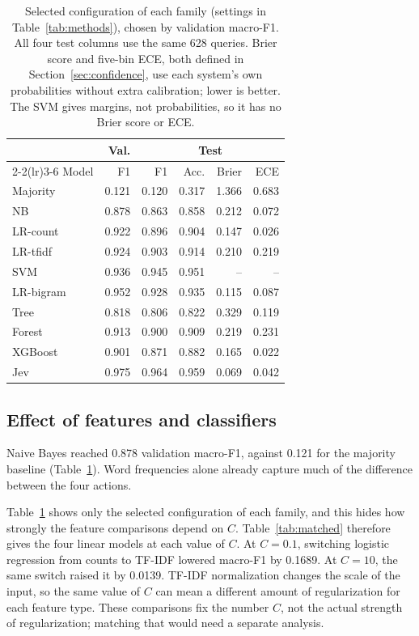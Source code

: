 \documentclass[conference]{IEEEtran}
\begin{document}
\begin{table}[tbp]
\centering\caption{Selected configuration of each family (settings in Table~\ref{tab:methods}), chosen by validation macro-F1. All four test columns use the same 628 queries. Brier score and five-bin ECE, both defined in Section~\ref{sec:confidence}, use each system's own probabilities without extra calibration; lower is better. The SVM gives margins, not probabilities, so it has no Brier score or ECE.}\label{tab:results}
\setlength{\tabcolsep}{4pt}
\begin{tabular}{lrrrrr}\toprule
&Val.&\multicolumn{4}{c}{Test}\\ \cmidrule(lr){2-2}\cmidrule(lr){3-6}
Model & F1 & F1 & Acc. & Brier & ECE\\ \midrule
Majority & 0.121 & 0.120 & 0.317 & 1.366 & 0.683\\
NB & 0.878 & 0.863 & 0.858 & 0.212 & 0.072\\
LR-count & 0.922 & 0.896 & 0.904 & 0.147 & 0.026\\
LR-tfidf & 0.924 & 0.903 & 0.914 & 0.210 & 0.219\\
SVM & 0.936 & 0.945 & 0.951 & -- & --\\
LR-bigram & 0.952 & 0.928 & 0.935 & 0.115 & 0.087\\
Tree & 0.818 & 0.806 & 0.822 & 0.329 & 0.119\\
Forest & 0.913 & 0.900 & 0.909 & 0.219 & 0.231\\
XGBoost & 0.901 & 0.871 & 0.882 & 0.165 & 0.022\\
Jev & 0.975 & 0.964 & 0.959 & 0.069 & 0.042\\ \bottomrule
\end{tabular}
\end{table}

\subsection{Effect of features and classifiers}
Naive Bayes reached 0.878 validation macro-F1, against 0.121 for the majority baseline (Table~\ref{tab:results}). Word frequencies alone already capture much of the difference between the four actions.

Table~\ref{tab:results} shows only the selected configuration of each family, and this hides how strongly the feature comparisons depend on \(C\). Table~\ref{tab:matched} therefore gives the four linear models at each value of \(C\). At \(C=0.1\), switching logistic regression from counts to TF-IDF lowered macro-F1 by 0.1689. At \(C=10\), the same switch raised it by 0.0139. TF-IDF normalization changes the scale of the input, so the same value of \(C\) can mean a different amount of regularization for each feature type. These comparisons fix the number \(C\), not the actual strength of regularization; matching that would need a separate analysis.
\end{document}
